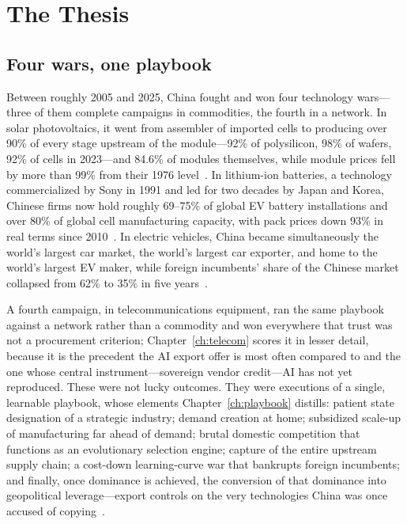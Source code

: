 \chapter{The Thesis}
\label{ch:thesis}

\section{Four wars, one playbook}

Between roughly 2005 and 2025, China fought and won four technology wars---three of them complete campaigns in commodities, the fourth in a network. In solar photovoltaics, it went from assembler of imported cells to producing over 90\% of every stage upstream of the module---92\% of polysilicon, 98\% of wafers, 92\% of cells in 2023---and 84.6\% of modules themselves, while module prices fell by more than 99\% from their 1976 level~\cite{owid-learning,pv-shares-2023}. In lithium-ion batteries, a technology commercialized by Sony in 1991 and led for two decades by Japan and Korea, Chinese firms now hold roughly 69--75\% of global EV battery installations and over 80\% of global cell manufacturing capacity, with pack prices down 93\% in real terms since 2010~\cite{sne-2025,iea-gevo-2026,bnef-2025}. In electric vehicles, China became simultaneously the world's largest car market, the world's largest car exporter, and home to the world's largest EV maker, while foreign incumbents' share of the Chinese market collapsed from 62\% to 35\% in five years~\cite{rhodium-evs,caam-2025}.

A fourth campaign, in telecommunications equipment, ran the same playbook against a network rather than a commodity and won everywhere that trust was not a procurement criterion; Chapter~\ref{ch:telecom} scores it in lesser detail, because it is the precedent the AI export offer is most often compared to and the one whose central instrument---sovereign vendor credit---AI has not yet reproduced. These were not lucky outcomes. They were executions of a single, learnable playbook, whose elements Chapter~\ref{ch:playbook} distills: patient state designation of a strategic industry; demand creation at home; subsidized scale-up of manufacturing far ahead of demand; brutal domestic competition that functions as an evolutionary selection engine; capture of the entire upstream supply chain; a cost-down learning-curve war that bankrupts foreign incumbents; and finally, once dominance is achieved, the conversion of that dominance into geopolitical leverage---export controls on the very technologies China was once accused of copying~\cite{mofcom-battery-controls,csis-rare-earth}.

